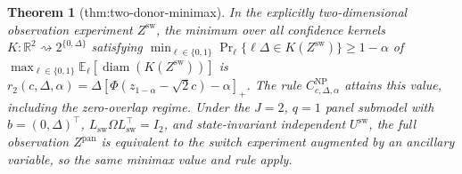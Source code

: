 \documentclass{article}
\newtheorem{theorem}{Theorem}
\begin{document}
\begin{theorem}[thm:two-donor-minimax]\label{thm:two-donor-minimax}
In the explicitly two-dimensional observation experiment \(Z^{\mathrm{sw}}\), the minimum over all confidence kernels \(K:\mathbb R^2\rightsquigarrow2^{\{0,\Delta\}}\) satisfying \(\min_{\ell\in\{0,1\}}\Pr_{\ell}\{\ell\Delta\in K(Z^{\mathrm{sw}})\}\ge1-\alpha\) of \(\max_{\ell\in\{0,1\}}\mathbb E_{\ell}[\operatorname{diam}(K(Z^{\mathrm{sw}}))]\) is \(r_2(c,\Delta,\alpha)=\Delta[\Phi(z_{1-\alpha}-\sqrt2c)-\alpha]_+\). The rule \(C^{\mathrm{NP}}_{c,\Delta,\alpha}\) attains this value, including the zero-overlap regime. Under the \(J=2\), \(q=1\) panel submodel with \(b=(0,\Delta)^{\top}\), \(L_{\mathrm{sw}}\Omega L_{\mathrm{sw}}^{\top}=I_2\), and state-invariant independent \(U^{\mathrm{sw}}\), the full observation \(Z^{\mathrm{pan}}\) is equivalent to the switch experiment augmented by an ancillary variable, so the same minimax value and rule apply.
\end{theorem}
\end{document}

